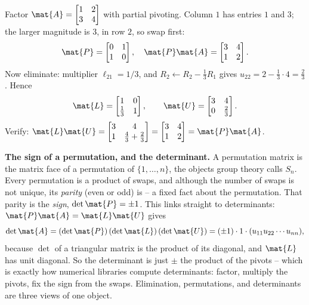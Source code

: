 \begin{example}[A full $\mat{P}\mat{A}=\mat{L}\mat{U}$]
\label{ch09:ex-palu}
Factor $\mat{A}=\begin{bmatrix} 1 & 2 \\ 3 & 4 \end{bmatrix}$ with partial pivoting. Column
$1$ has entries $1$ and $3$; the larger magnitude is $3$, in row $2$, so swap first:
\[
  \mat{P} = \begin{bmatrix} 0&1\\1&0 \end{bmatrix},\quad
  \mat{P}\mat{A} = \begin{bmatrix} 3 & 4 \\ 1 & 2 \end{bmatrix}.
\]
Now eliminate: multiplier $\ell_{21}=1/3$, and
$R_2 \leftarrow R_2 - \tfrac13 R_1$ gives $u_{22} = 2 - \tfrac13\cdot 4 = \tfrac23$. Hence
\[
  \mat{L} = \begin{bmatrix} 1 & 0 \\ \tfrac13 & 1 \end{bmatrix}, \qquad
  \mat{U} = \begin{bmatrix} 3 & 4 \\ 0 & \tfrac23 \end{bmatrix}.
\]
Verify: $\mat{L}\mat{U} = \begin{bmatrix} 3 & 4 \\ 1 & \tfrac43 + \tfrac23 \end{bmatrix}
= \begin{bmatrix} 3 & 4 \\ 1 & 2 \end{bmatrix} = \mat{P}\mat{A}$. \checkmark
\end{example}

\begin{connectionbox}
\textbf{The sign of a permutation, and the determinant.} A permutation matrix is the matrix
face of a permutation of $\{1,\dots,n\}$, the objects group theory calls $S_n$. Every
permutation is a product of swaps, and although the number of swaps is not unique, its
\emph{parity} (even or odd) is -- a fixed fact about the permutation. That parity is the
\emph{sign}, $\det\mat{P}=\pm 1$. This links straight to determinants:
$\mat{P}\mat{A}=\mat{L}\mat{U}$ gives
\[
  \det\mat{A} = (\det\mat{P})\,(\det\mat{L})\,(\det\mat{U})
              = (\pm 1)\cdot 1 \cdot (u_{11}u_{22}\cdots u_{nn}),
\]
because $\det$ of a triangular matrix is the product of its diagonal, and $\mat{L}$ has unit
diagonal. So the determinant is just $\pm$ the product of the pivots -- which is exactly how
numerical libraries compute determinants: factor, multiply the pivots, fix the sign from the
swaps. Elimination, permutations, and determinants are three views of one object.
\end{connectionbox}


